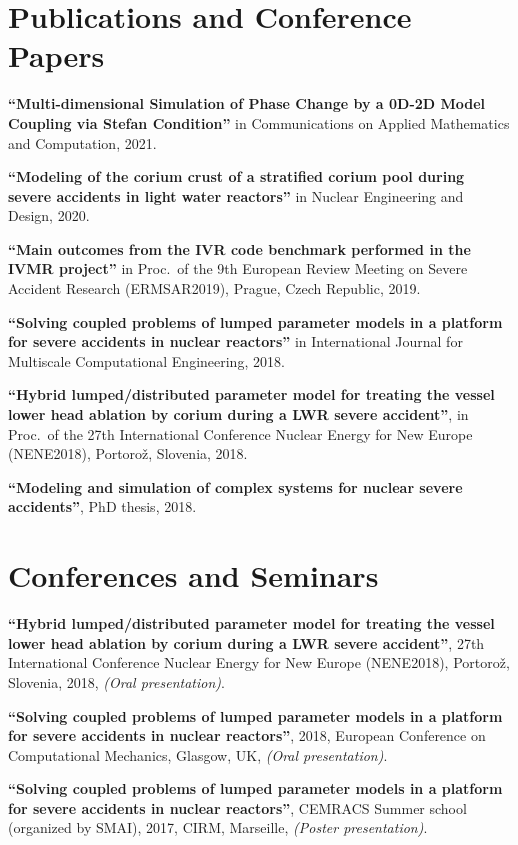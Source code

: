 \documentclass{article}
\renewenvironment{itemize}{
  \begin{list}{}{
      \setlength{\leftmargin}{1.5em}
      \setlength{\itemsep}{0.25em}
      \setlength{\parskip}{0pt}
      \setlength{\parsep}{0.25em}
    }
}{
  \end{list}
}
\begin{document}
\section*{Publications and Conference Papers}
\begin{itemize}
	\item \textbf{``Multi-dimensional Simulation of Phase Change by a 0D-2D Model Coupling via Stefan Condition''} in Communications on Applied Mathematics and Computation, 2021.
	\item \textbf{``Modeling of the corium crust of a stratified corium pool during severe accidents in light water reactors''} in Nuclear Engineering and Design, 2020. 
	\item \textbf{``Main outcomes from the IVR code benchmark performed in the IVMR project''} in Proc.~of the 9th European Review Meeting on Severe Accident Research (ERMSAR2019),
Prague, Czech Republic, 2019.
	\item \textbf{``Solving coupled problems of lumped parameter models in a platform for severe accidents in nuclear reactors''} in International Journal for Multiscale Computational Engineering, 2018.
	\item \textbf{``Hybrid lumped/distributed parameter model for treating the vessel lower head ablation by corium during a LWR severe accident''}, in Proc.~of the 27th International Conference Nuclear Energy for New Europe (NENE2018), Portorož, Slovenia, 2018.
	\item \textbf{``Modeling and simulation of complex systems for nuclear severe accidents''}, PhD thesis, 2018.
\end{itemize}  

\section*{Conferences and Seminars}
\begin{itemize}
	\item \textbf{``Hybrid lumped/distributed parameter model for treating the vessel lower head ablation by corium during a LWR severe accident''}, 27th International Conference Nuclear Energy for New Europe (NENE2018), Portorož, Slovenia, 2018, \textit{(Oral presentation)}.
	\item \textbf{``Solving coupled problems of lumped parameter models in a platform for severe accidents in nuclear reactors''}, 2018, European Conference on Computational Mechanics, Glasgow, UK, \textit{(Oral presentation)}.
	\item \textbf{``Solving coupled problems of lumped parameter models in a platform for severe accidents in nuclear reactors''}, CEMRACS Summer school (organized by SMAI), 2017, CIRM, Marseille, \textit{(Poster presentation)}.
\end{itemize}  
\end{document}
